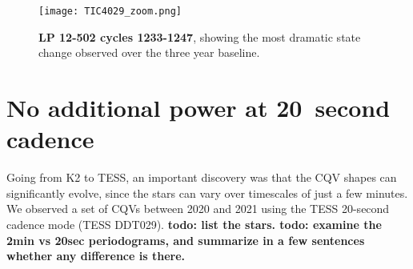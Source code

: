 \documentclass[11pt,twocolumn,tighten]{aastex63}
\begin{document}
\begin{figure*}[!t]
	\begin{center}
		\centering
		\texttt{[image: TIC4029\_zoom.png]}
		\vspace{-0.45cm}
		\caption{
			{\bf LP 12-502 cycles 1233-1247}, showing the most dramatic state
			change observed over the three year baseline.
		}
		\label{fig:lpzoom}
	\end{center}
\end{figure*}


\section{No additional power at 20~second cadence}

Going from K2 to TESS, an important discovery was that the CQV shapes
can significantly evolve, since the stars can vary over timescales of just a few minutes.
We observed a set of CQVs between 2020 and 2021 using the TESS 20-second
cadence mode (TESS DDT029).
{\bf todo: list the stars.  todo: examine the 2min vs 20sec periodograms, and summarize in a few
sentences whether any difference is there.}






\clearpage
\listofchanges
\end{document}
